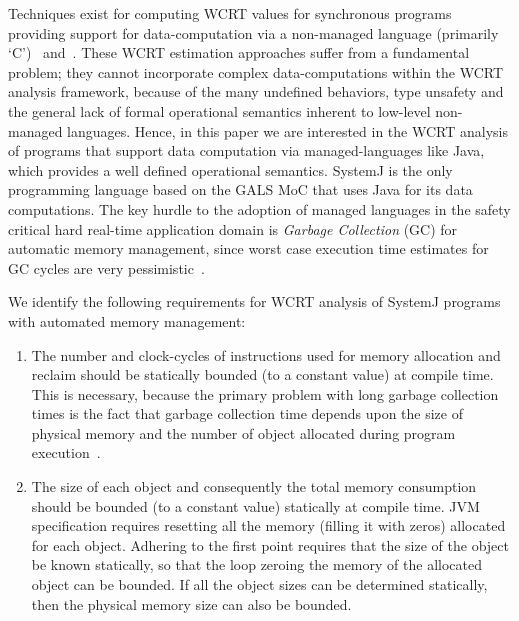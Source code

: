 Techniques exist for computing WCRT values for synchronous programs
providing support for data-computation via a non-managed language
(primarily `C')~\cite{boldt07} and~\cite{proop10}. These WCRT estimation
approaches suffer from a fundamental problem; they cannot incorporate
complex data-computations within the WCRT analysis framework, because of
the many undefined behaviors, type unsafety and the general lack of
formal operational semantics inherent to low-level non-managed
languages. Hence, in this paper we are interested in the WCRT analysis
of programs that support data computation via managed-languages like
Java, which provides a well defined operational
semantics. {\color{black} SystemJ is the only programming language based
  on the GALS MoC that uses Java for its data computations.} The key
hurdle to the adoption of managed languages in the safety critical hard
real-time application domain is \textit{Garbage Collection} (GC) for
automatic memory management, since worst case execution time estimates
for GC cycles are very pessimistic~\cite{puffitsch2013design}.

{\color{black}

  We identify the following requirements for WCRT analysis of SystemJ
  programs with automated memory management:

  \begin{enumerate}

  \item The number and clock-cycles of instructions used for memory
    allocation and reclaim should be statically bounded (to a constant
    value) at compile time. This is necessary, because the primary
    problem with long garbage collection times is the fact that garbage
    collection time depends upon the size of physical memory and the
    number of object allocated during program
    execution~\cite{schoeberl2010scheduling}.

  \item The size of each object and consequently the total memory
    consumption should be bounded (to a constant value) statically at
    compile time. JVM specification requires resetting all the memory
    (filling it with zeros) allocated for each object. Adhering to the
    first point requires that the size of the object be known
    statically, so that the loop zeroing the memory of the allocated
    object can be bounded. If all the object sizes can be determined
    statically, then the physical memory size can also be bounded.

  \end{enumerate}

}

